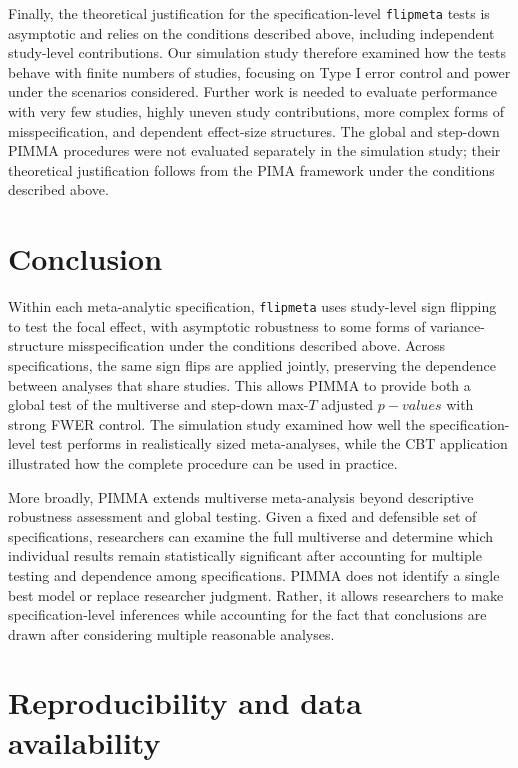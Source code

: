 \documentclass[
  man,
  longtable,
  nolmodern,
  notxfonts,
  notimes,
  colorlinks=true,linkcolor=blue,citecolor=blue,urlcolor=blue]{apa7}
\begin{document}
Finally, the theoretical justification for the specification-level
\texttt{flipmeta} tests is asymptotic and relies on the conditions
described above, including independent study-level contributions. Our
simulation study therefore examined how the tests behave with finite
numbers of studies, focusing on Type I error control and power under the
scenarios considered. Further work is needed to evaluate performance
with very few studies, highly uneven study contributions, more complex
forms of misspecification, and dependent effect-size structures. The
global and step-down PIMMA procedures were not evaluated separately in
the simulation study; their theoretical justification follows from the
PIMA framework under the conditions described above.

\section{Conclusion}\label{conclusion}

Within each meta-analytic specification, \texttt{flipmeta} uses
study-level sign flipping to test the focal effect, with asymptotic
robustness to some forms of variance-structure misspecification under
the conditions described above. Across specifications, the same sign
flips are applied jointly, preserving the dependence between analyses
that share studies. This allows PIMMA to provide both a global test of
the multiverse and step-down max-\(T\) adjusted \(p-values\) with strong
FWER control. The simulation study examined how well the
specification-level test performs in realistically sized meta-analyses,
while the CBT application illustrated how the complete procedure can be
used in practice.

More broadly, PIMMA extends multiverse meta-analysis beyond descriptive
robustness assessment and global testing. Given a fixed and defensible
set of specifications, researchers can examine the full multiverse and
determine which individual results remain statistically significant
after accounting for multiple testing and dependence among
specifications. PIMMA does not identify a single best model or replace
researcher judgment. Rather, it allows researchers to make
specification-level inferences while accounting for the fact that
conclusions are drawn after considering multiple reasonable analyses.

\section{Reproducibility and data
availability}\label{reproducibility-and-data-availability}
\end{document}
